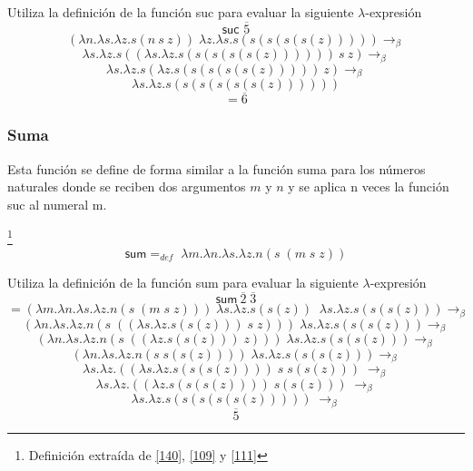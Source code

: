         \begin{exercise}
            Utiliza la definición de la función \textsf{suc} para evaluar la siguiente  $\lambda$-expresión
            \[
                \textsf{suc } \overline{5}
            \]
            \[
                (\lambda n.\lambda s.\lambda z.s(n\ s\ z)) \; \lambda z.\lambda s.s(s(s(s(s(z))))) \rightarrow_\beta
            \]
		\[
			 \lambda s.\lambda z.s((\lambda s.\lambda z.s(s(s(s(s(z))))))\ s\ z)  \rightarrow_\beta	
		\]
            \[
                \lambda s.\lambda z.s(\lambda z.s(s(s(s(s(z)))))\ z) \rightarrow_\beta 
            \]
		\[
			\lambda s.\lambda z.s(s(s(s(s(s(z))))))
		\]
            \[
                = \overline{6}
            \]
        \end{exercise}
        
    \subsubsection{Suma}
        Esta función se define de forma similar a la función suma para los números naturales  donde se reciben dos argumentos $m$ y $n$ y se aplica n veces la función \textsf{suc} al numeral m.

        \begin{definition}\footnote{Definición extraída de \hyperlink{140}{[140]}, \hyperlink{109}{[109]} y  \hyperlink{111}{[111]}}
            $$\textsf{sum} =_{def}  \; \lambda m.\lambda n.\lambda s.\lambda z.n(s \; (m \; s \; z))$$
        \end{definition}

        \begin{exercise}
            Utiliza la definición de la función \textsf{sum} para evaluar la siguiente  $\lambda$-expresión
            \[
                \textsf{sum}\  \overline{2} \; \overline{3} 
            \]
            \[
                = (\lambda m.\lambda n.\lambda s.\lambda z.n(s \; (m\; s \; z))) \; \lambda s.\lambda z.s(s(z)) \;\; \lambda s.\lambda z.s(s(s(z))) \rightarrow_\beta 
            \]
           \[
                (\lambda n.\lambda s.\lambda z.n(s \; ((\lambda s.\lambda z.s(s(z)))\; s \; z))) \; \lambda s.\lambda z.s(s(s(z))) \rightarrow_\beta 
            \]
           \[
                (\lambda n.\lambda s.\lambda z.n(s \; ((\lambda z.s(s(z))) \; z))) \; \lambda s.\lambda z.s(s(s(z))) \rightarrow_\beta 
            \]
           \[
                (\lambda n.\lambda s.\lambda z.n (s \; s(s(z)))) \; \lambda s.\lambda z.s(s(s(z))) \rightarrow_\beta 
            \]
           \[
                \lambda s.\lambda z.((\lambda s.\lambda z.s(s(s(z))))\; s \; s(s(z))) \; \rightarrow_\beta 
            \]
           \[
                \lambda s.\lambda z.((\lambda z.s(s(s(z)))) \; s(s(z))) \; \rightarrow_\beta 
            \]
           \[
                \lambda s.\lambda z.s(s(s(s(s(z))))) \; \rightarrow_\beta 
            \]
		\[
			\overline{5}
		\]
         
        \end{exercise}


